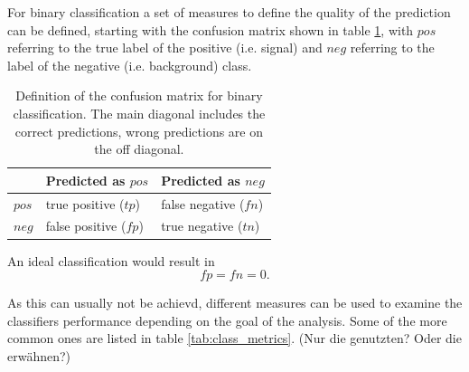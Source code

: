 For binary classification a set of measures
to define the quality of the prediction can be defined, starting with the confusion matrix
shown in table \ref{tab:confusion},
with $pos$ referring to the true label of the positive (i.e. signal)
and $neg$ referring to the label of the negative (i.e. background) class.

\begin{table}
    \caption{Definition of the confusion matrix for binary classification.
    The main diagonal includes the correct predictions, wrong predictions are on the off diagonal.}
    \begin{center}
        \begin{tabular}{ l| l l}
            {} & Predicted as $pos$ & Predicted as $neg$ \\
            \hline
            $pos$ & true positive ($tp$) & false negative ($fn$) \\
            $neg$ & false positive ($fp$) & true negative ($tn$) \\
        \end{tabular}
    \end{center}
    \label{tab:confusion}
\end{table}

An ideal classification would result in
\begin{equation*}
  fp = fn = 0.
\end{equation*}

As this can usually not be achievd, different measures
can be used to examine the classifiers performance
depending on the goal of the analysis.
Some of the more common ones are listed in table \ref{tab:class_metrics}.
(Nur die genutzten? Oder die erwähnen?)

